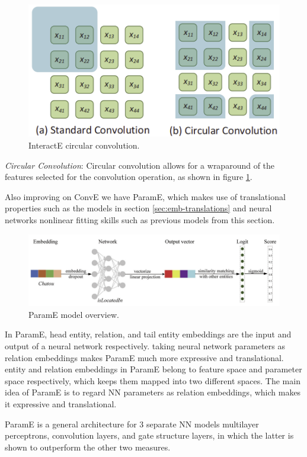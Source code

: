 \begin{figure}[!ht]
    \centering
    \includegraphics[width=.65\textwidth]{fig/embeddings/interactE_convolutions.png}
    \caption{InteractE circular convolution.}
    \label{fig:emb-interactE_conv}
\end{figure}

\textit{Circular Convolution}: Circular convolution allows for a wraparound of the features selected for the convolution operation, as shown in figure \ref{fig:emb-interactE_conv}.

Also improving on ConvE we have ParamE, which makes use of translational properties such as the models in section \ref{sec:emb-translations} and neural networks nonlinear fitting skills such as previous models from this section.

\begin{figure}[!ht]
    \centering
    \includegraphics[width=\textwidth]{fig/embeddings/ParamE.png}
    \caption{ParamE model overview.}
    \label{fig:emb-paramE}
\end{figure}

In ParamE, head entity, relation, and tail entity embeddings are the input and output of a neural network respectively. taking neural network parameters as relation embeddings makes ParamE much more expressive and translational. entity and relation embeddings in ParamE belong to feature space and parameter space respectively, which keeps them mapped into two different spaces. The main idea of ParamE is to regard NN parameters as relation embeddings, which makes it expressive and translational.

ParamE is a general architecture for 3 separate NN models multilayer perceptrons, convolution layers, and gate structure layers, in which the latter is shown to outperform the other two measures.


